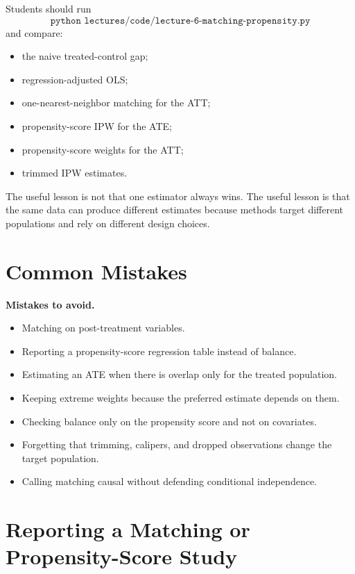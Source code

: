 Students should run
\[
    \texttt{python lectures/code/lecture-6-matching-propensity.py}
\]
and compare:
\begin{itemize}
    \item the naive treated-control gap;
    \item regression-adjusted OLS;
    \item one-nearest-neighbor matching for the ATT;
    \item propensity-score IPW for the ATE;
    \item propensity-score weights for the ATT;
    \item trimmed IPW estimates.
\end{itemize}
The useful lesson is not that one estimator always wins. The useful lesson is
that the same data can produce different estimates because methods target
different populations and rely on different design choices.

\section{Common Mistakes}

\begin{boxF}
\textbf{Mistakes to avoid.}
\begin{itemize}
    \item Matching on post-treatment variables.
    \item Reporting a propensity-score regression table instead of balance.
    \item Estimating an ATE when there is overlap only for the treated
    population.
    \item Keeping extreme weights because the preferred estimate depends on
    them.
    \item Checking balance only on the propensity score and not on covariates.
    \item Forgetting that trimming, calipers, and dropped observations change
    the target population.
    \item Calling matching causal without defending conditional independence.
\end{itemize}
\end{boxF}

\section{Reporting a Matching or Propensity-Score Study}

